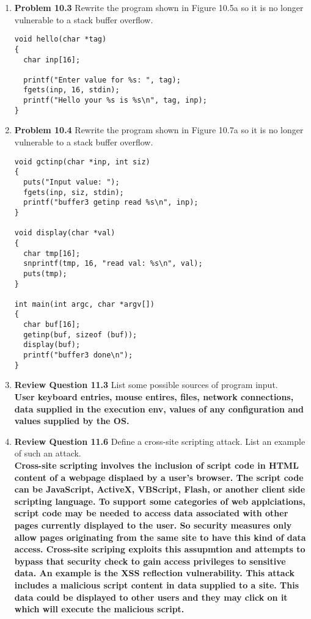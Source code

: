 \documentclass[12pt]{article}
\begin{document}
\begin{enumerate}
\item \textbf{Problem 10.3} Rewrite the program shown in Figure 10.5a so it is no longer vulnerable to a stack buffer overflow. \\

\begin{lstlisting}
void hello(char *tag)
{
  char inp[16];

  printf("Enter value for %s: ", tag);
  fgets(inp, 16, stdin);
  printf("Hello your %s is %s\n", tag, inp);
}
\end{lstlisting}

\item \textbf{Problem 10.4}  Rewrite the program shown in Figure 10.7a so it is no longer vulnerable to a stack buffer overflow. \\

\begin{lstlisting}
void gctinp(char *inp, int siz)
{
  puts("Input value: ");
  fgets(inp, siz, stdin);
  printf("buffer3 getinp read %s\n", inp);
}

void display(char *val)
{
  char tmp[16];
  snprintf(tmp, 16, "read val: %s\n", val);
  puts(tmp);
}

int main(int argc, char *argv[])
{
  char buf[16];
  getinp(buf, sizeof (buf));
  display(buf);
  printf("buffer3 done\n");
}
\end{lstlisting}

\item \textbf{Review Question 11.3} List some possible sources of program input. \\

\textbf{User keyboard entries, mouse entires, files, network connections, data supplied in the execution env, values of any configuration and values supplied by the OS.}

\item \textbf{Review Question 11.6} Define a cross-site scripting attack. List an example of such an attack. \\

\textbf{Cross-site scripting involves the inclusion of script code in HTML content of a webpage displaed by a user's browser. The script code can be JavaScript, ActiveX, VBScript, Flash, or another client side scripting language. To support some categories of web applciations, script code may be needed to access data associated with other pages currently displayed to the user. So security measures only allow pages originating from the same site to have this kind of data access. Cross-site scriping exploits this assupmtion and attempts to bypass that security check to gain access privileges to sensitive data.
An example is the XSS reflection vulnerability. This attack includes a malicious script content in data supplied to a site. This data could be displayed to other users and they may click on it which will execute the malicious script.}
\end{enumerate}
\end{document}
